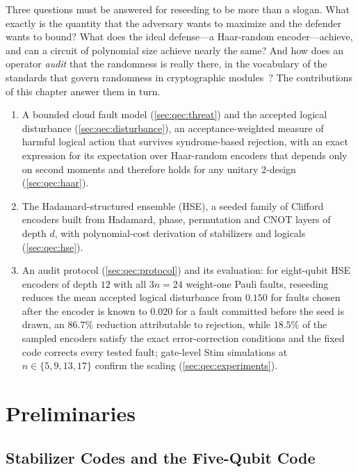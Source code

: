 Three questions must be answered for reseeding to be more than a slogan. What exactly is the quantity that the adversary wants to maximize and the defender wants to bound? What does the ideal defense---a Haar-random encoder---achieve, and can a circuit of polynomial size achieve nearly the same? And how does an operator \emph{audit} that the randomness is really there, in the vocabulary of the standards that govern randomness in cryptographic modules~\cite{nist2015sp80090a,nist2019fips1403}? The contributions of this chapter answer them in turn.
\begin{enumerate}
  \item A bounded cloud fault model (\cref{sec:qec:threat}) and the accepted logical disturbance (\cref{sec:qec:disturbance}), an acceptance-weighted measure of harmful logical action that survives syndrome-based rejection, with an exact expression for its expectation over Haar-random encoders that depends only on second moments and therefore holds for any unitary 2-design (\cref{sec:qec:haar}).
  \item The Hadamard-structured ensemble (HSE), a seeded family of Clifford encoders built from Hadamard, phase, permutation and CNOT layers of depth $d$, with polynomial-cost derivation of stabilizers and logicals (\cref{sec:qec:hse}).
  \item An audit protocol (\cref{sec:qec:protocol}) and its evaluation: for eight-qubit HSE encoders of depth $12$ with all $3n=24$ weight-one Pauli faults, reseeding reduces the mean accepted logical disturbance from $0.150$ for faults chosen after the encoder is known to $0.020$ for a fault committed before the seed is drawn, an $86.7\%$ reduction attributable to rejection, while $18.5\%$ of the sampled encoders satisfy the exact error-correction conditions and the fixed  code corrects every tested fault; gate-level Stim simulations at $n\in\{5,9,13,17\}$ confirm the scaling (\cref{sec:qec:experiments}).
\end{enumerate}

\section{Preliminaries}\label{sec:qec:prelim}

\subsection{Stabilizer Codes and the Five-Qubit Code}\label{sec:qec:stabilizer}

